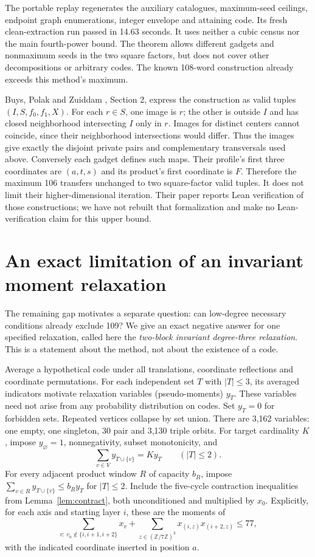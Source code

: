 \documentclass[11pt]{article}
\theoremstyle{definition}
\newcommand{\Z}{\mathbb Z}
\begin{document}
The portable replay regenerates the auxiliary catalogues, maximum-seed
ceilings, endpoint graph enumerations, integer envelope and attaining
code. Its fresh clean-extraction run passed in 14.63 seconds. It uses
neither a cubic census nor the main fourth-power bound. The theorem
allows different gadgets and nonmaximum seeds in the two square
factors, but does not cover other decompositions or arbitrary codes.
The known 108-word construction already exceeds this method's maximum.

Buys, Polak and Zuiddam \cite{bpz}, Section 2, express the construction
as valid tuples $(I,S,f_0,f_1,X)$. For each $r\in S$, one image is $r$;
the other is outside $I$ and has closed neighborhood intersecting $I$
only in $r$. Images for distinct centers cannot coincide, since their
neighborhood intersections would differ. Thus the images give exactly
the disjoint private pairs and complementary transversals used above.
Conversely each gadget defines such maps. Their profile's first three
coordinates are $(a,t,s)$ and its product's first coordinate is $F$.
Therefore the maximum 106 transfers unchanged to two square-factor valid
tuples. It does not limit their higher-dimensional iteration. Their
paper reports Lean verification of those constructions; we have not
rebuilt that formalization and make no Lean-verification claim for this
upper bound.


\section{An exact limitation of an invariant moment relaxation}
The remaining gap motivates a separate question: can low-degree necessary
conditions already exclude 109? We give an exact negative answer for one
specified relaxation, called here the \emph{two-block invariant
degree-three relaxation}. This is a statement about the method, not about the
existence of a code.

Average a hypothetical code under all translations, coordinate reflections
and coordinate permutations. For each independent set $T$ with $|T|\leq3$,
its averaged indicators motivate relaxation variables (pseudo-moments)
$y_T$. These variables need not arise from any probability distribution
on codes. Set $y_T=0$ for forbidden
sets. Repeated vertices collapse by set union. There are 3,162 variables:
one empty, one singleton, 30 pair and 3,130 triple orbits.
For target cardinality $K$, impose $y_\varnothing=1$, nonnegativity,
subset monotonicity, and
\[
 \sum_{v\in V}y_{T\cup\{v\}}=K y_T\qquad(|T|\leq2).
\]
For every adjacent product window $R$ of capacity $b_R$, impose
$\sum_{v\in R}y_{T\cup\{v\}}\leq b_Ry_T$ for $|T|\leq2$.
Include the five-cycle contraction inequalities from
Lemma~\ref{lem:contract}, both unconditioned and multiplied by $x_0$.
Explicitly, for each axis and starting layer $i$, these are the moments of
\[
 \sum_{v:\,v_a\notin\{i,i+1,i+2\}}x_v
 +\sum_{z\in(\Z/7\Z)^3}x_{(i,z)}x_{(i+2,z)}\leq77,
\]
with the indicated coordinate inserted in position $a$.
\end{document}
